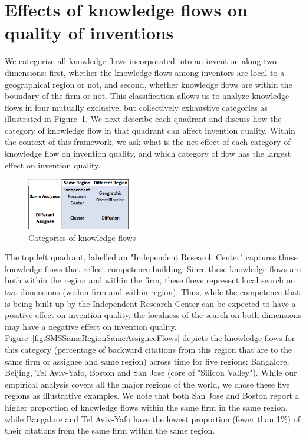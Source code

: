 \documentclass[parskip=full,12pt,letterpaper]{article}
\begin{document}
\section*{Effects of knowledge flows on quality of inventions}
We categorize all knowledge flows incorporated into an invention along two dimensions:  first, whether the knowledge flows among inventors are local to a geographical region or not, and second, whether knowledge flows are within the boundary of the firm or not. This classification allows us to analyze knowledge flows in four mutually exclusive, but collectively exhaustive categories as illustrated in Figure~\ref{fig:2x2}. We next describe each quadrant and discuss how the category of knowledge flow in that quadrant can affect invention quality. Within the context of this framework, we ask what is the net effect of each category of knowledge flow on invention quality, and which category of flow has the largest effect on invention quality. \par
\begin{figure}[h!]
\begin{centering}
  \includegraphics[width=0.4\textwidth]{2x2}
  \caption{Categories of knowledge flows}
  \label{fig:2x2}
\end{centering}
\end{figure}



The top left quadrant, labelled an "Independent Research Center" captures those knowledge flows that reflect competence building. Since these knowledge flows  are both within the region and within the firm, these flows represent local search on two dimensions (within firm and within region).  Thus, while the competence that is being built up by the Independent Research Center can be expected to have a positive effect on invention quality, the localness of the search on both dimensions may have a negative effect on invention quality. Figure~\ref{fig:SMSSameRegionSameAssigneeFlows} depicts the knowledge flows for this category (percentage of backward citations from this region that are to the same firm or assignee and same region) across time for five regions: Bangalore, Beijing, Tel Aviv-Yafo, Boston and San Jose (core of "Silicon Valley"). While our empirical analysis covers all the major regions of the world, we chose these five regions as illustrative examples. We note that both San Jose and Boston report a higher proportion of knowledge flows within the same firm in the same region, while Bangalore and Tel Aviv-Yafo have the lowest proportion (fewer than 1\%) of their citations from the same firm within the same region. \par
\end{document}
